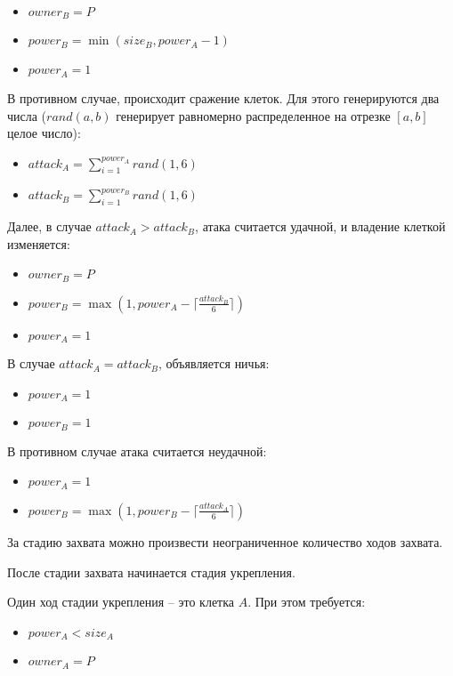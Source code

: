 \documentclass[12pt, a4paper]{article}
\begin{document}
\begin{itemize}
\item $owner_B = P$
\item $power_B = \min(size_B, power_A - 1)$
\item $power_A = 1$
\end{itemize}

В противном случае, происходит сражение клеток. Для этого генерируются два числа ($rand(a, b)$ генерирует равномерно распределенное на отрезке $[a, b]$ целое число):

\begin{itemize}
\item $attack_A = \sum \limits_{i=1}^{power_A} rand(1, 6) $
\item $attack_B = \sum \limits_{i=1}^{power_B} rand(1, 6) $
\end{itemize}

Далее, в случае $attack_A > attack_B$, атака считается удачной, и владение клеткой изменяется:

\begin{itemize}
\item $owner_B = P$
\item $power_B = \max(1, power_A - \lceil \frac{attack_B}{6} \rceil)$
\item $power_A = 1$
\end{itemize}

В случае $attack_A = attack_B$, объявляется ничья:

\begin{itemize}
\item $power_A = 1$
\item $power_B = 1$
\end{itemize}

В противном случае атака считается неудачной:

\begin{itemize}
\item $power_A = 1$
\item $power_B = \max(1, power_B - \lceil \frac{attack_A}{6} \rceil)$
\end{itemize}

За стадию захвата можно произвести неограниченное количество ходов захвата.

После стадии захвата начинается стадия укрепления. 

Один ход стадии укрепления -- это клетка $A$. При этом требуется:

\begin{itemize}
\item $power_A < size_A$
\item $owner_A = P$
\end{itemize}
\end{document}
